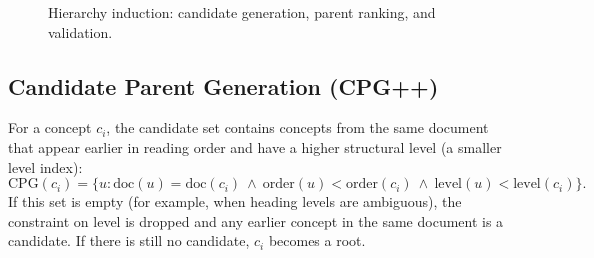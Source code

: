 \documentclass[12pt,a4paper]{report}
\begin{document}
\begin{figure}[!htbp]
\centering
{}
\caption{Hierarchy induction: candidate generation, parent ranking, and validation.}
\label{fig:hier}
\end{figure}

\subsection{Candidate Parent Generation (CPG++)}
For a concept $c_i$, the candidate set contains concepts from the same document that
appear earlier in reading order and have a higher structural level (a smaller level
index):
\begin{equation}
\text{CPG}(c_i)=\{u : \text{doc}(u)=\text{doc}(c_i)\ \wedge\ \text{order}(u)<\text{order}(c_i)\ \wedge\ \text{level}(u)<\text{level}(c_i)\}.
\end{equation}
If this set is empty (for example, when heading levels are ambiguous), the constraint on
level is dropped and any earlier concept in the same document is a candidate. If there
is still no candidate, $c_i$ becomes a root.
\end{document}
